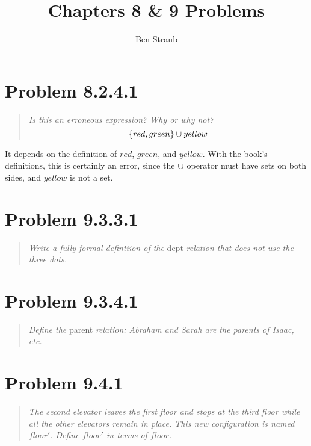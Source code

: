 \documentclass[11pt]{article}
\begin{document}
\title{Chapters 8 \& 9 Problems}
\author{Ben Straub}
\maketitle


\section{Problem 8.2.4.1}
\begin{quote}
  {\it
    Is this an erroneous expression? Why or why not?
    \[ \{red, green\} \cup yellow \]
  }
\end{quote}
It depends on the definition of $red$, $green$, and $yellow$.  With the book's definitions, this is
certainly an error, since the $\cup$ operator must have sets on both sides, and $yellow$ is not a set.



\section{Problem 9.3.3.1}
\begin{quote}
  {\it Write a fully formal defintiion of the} dept {\it relation that does not use the three dots.}
\end{quote}



\section{Problem 9.3.4.1}
\begin{quote}
  {\it Define the} parent {\it relation: Abraham and Sarah are the parents of Isaac, etc.}

\end{quote}

\section{Problem 9.4.1}
\begin{quote}
  {\it The second elevator leaves the first floor and stops at the third floor while all the other
    elevators remain in place. This new configuration is named $floor'$.  Define $floor'$ in terms
    of $floor$.}

\end{quote}
\end{document}
